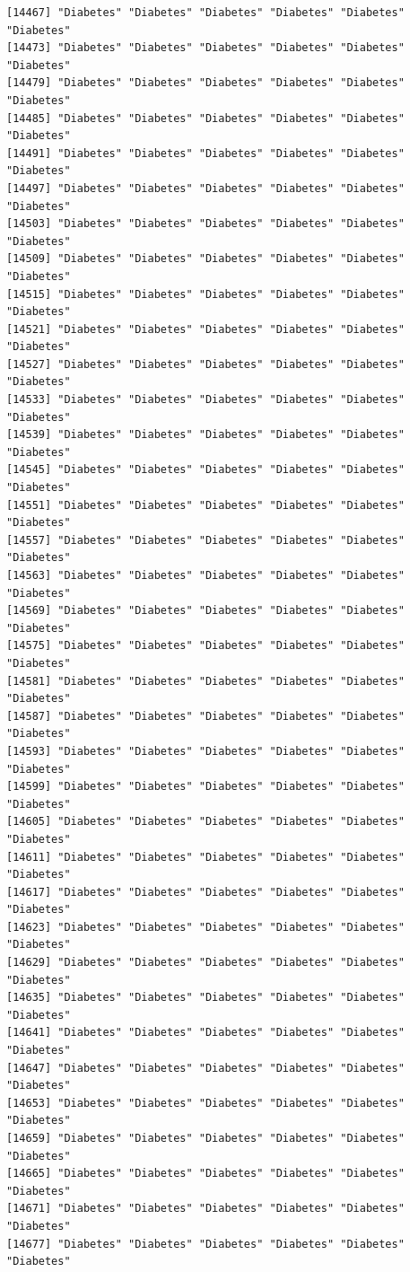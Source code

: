\documentclass[
  letterpaper,
  DIV=11,
  numbers=noendperiod]{scrartcl}
\begin{document}
\begin{verbatim}
[14467] "Diabetes" "Diabetes" "Diabetes" "Diabetes" "Diabetes" "Diabetes"
[14473] "Diabetes" "Diabetes" "Diabetes" "Diabetes" "Diabetes" "Diabetes"
[14479] "Diabetes" "Diabetes" "Diabetes" "Diabetes" "Diabetes" "Diabetes"
[14485] "Diabetes" "Diabetes" "Diabetes" "Diabetes" "Diabetes" "Diabetes"
[14491] "Diabetes" "Diabetes" "Diabetes" "Diabetes" "Diabetes" "Diabetes"
[14497] "Diabetes" "Diabetes" "Diabetes" "Diabetes" "Diabetes" "Diabetes"
[14503] "Diabetes" "Diabetes" "Diabetes" "Diabetes" "Diabetes" "Diabetes"
[14509] "Diabetes" "Diabetes" "Diabetes" "Diabetes" "Diabetes" "Diabetes"
[14515] "Diabetes" "Diabetes" "Diabetes" "Diabetes" "Diabetes" "Diabetes"
[14521] "Diabetes" "Diabetes" "Diabetes" "Diabetes" "Diabetes" "Diabetes"
[14527] "Diabetes" "Diabetes" "Diabetes" "Diabetes" "Diabetes" "Diabetes"
[14533] "Diabetes" "Diabetes" "Diabetes" "Diabetes" "Diabetes" "Diabetes"
[14539] "Diabetes" "Diabetes" "Diabetes" "Diabetes" "Diabetes" "Diabetes"
[14545] "Diabetes" "Diabetes" "Diabetes" "Diabetes" "Diabetes" "Diabetes"
[14551] "Diabetes" "Diabetes" "Diabetes" "Diabetes" "Diabetes" "Diabetes"
[14557] "Diabetes" "Diabetes" "Diabetes" "Diabetes" "Diabetes" "Diabetes"
[14563] "Diabetes" "Diabetes" "Diabetes" "Diabetes" "Diabetes" "Diabetes"
[14569] "Diabetes" "Diabetes" "Diabetes" "Diabetes" "Diabetes" "Diabetes"
[14575] "Diabetes" "Diabetes" "Diabetes" "Diabetes" "Diabetes" "Diabetes"
[14581] "Diabetes" "Diabetes" "Diabetes" "Diabetes" "Diabetes" "Diabetes"
[14587] "Diabetes" "Diabetes" "Diabetes" "Diabetes" "Diabetes" "Diabetes"
[14593] "Diabetes" "Diabetes" "Diabetes" "Diabetes" "Diabetes" "Diabetes"
[14599] "Diabetes" "Diabetes" "Diabetes" "Diabetes" "Diabetes" "Diabetes"
[14605] "Diabetes" "Diabetes" "Diabetes" "Diabetes" "Diabetes" "Diabetes"
[14611] "Diabetes" "Diabetes" "Diabetes" "Diabetes" "Diabetes" "Diabetes"
[14617] "Diabetes" "Diabetes" "Diabetes" "Diabetes" "Diabetes" "Diabetes"
[14623] "Diabetes" "Diabetes" "Diabetes" "Diabetes" "Diabetes" "Diabetes"
[14629] "Diabetes" "Diabetes" "Diabetes" "Diabetes" "Diabetes" "Diabetes"
[14635] "Diabetes" "Diabetes" "Diabetes" "Diabetes" "Diabetes" "Diabetes"
[14641] "Diabetes" "Diabetes" "Diabetes" "Diabetes" "Diabetes" "Diabetes"
[14647] "Diabetes" "Diabetes" "Diabetes" "Diabetes" "Diabetes" "Diabetes"
[14653] "Diabetes" "Diabetes" "Diabetes" "Diabetes" "Diabetes" "Diabetes"
[14659] "Diabetes" "Diabetes" "Diabetes" "Diabetes" "Diabetes" "Diabetes"
[14665] "Diabetes" "Diabetes" "Diabetes" "Diabetes" "Diabetes" "Diabetes"
[14671] "Diabetes" "Diabetes" "Diabetes" "Diabetes" "Diabetes" "Diabetes"
[14677] "Diabetes" "Diabetes" "Diabetes" "Diabetes" "Diabetes" "Diabetes"

\end{verbatim}
\end{document}
